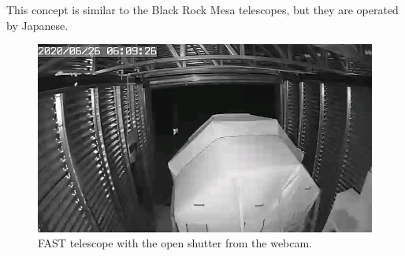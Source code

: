 \par
This concept is similar to the Black Rock Mesa telescopes, but they are operated by Japanese.

\begin{figure}[H]
 \centering
 \includegraphics[scale = 0.5]{./pictures/operatinFast}
 \caption{FAST telescope with the open shutter from the webcam.}
 \label{FASTCam}
 
\end{figure}

 







